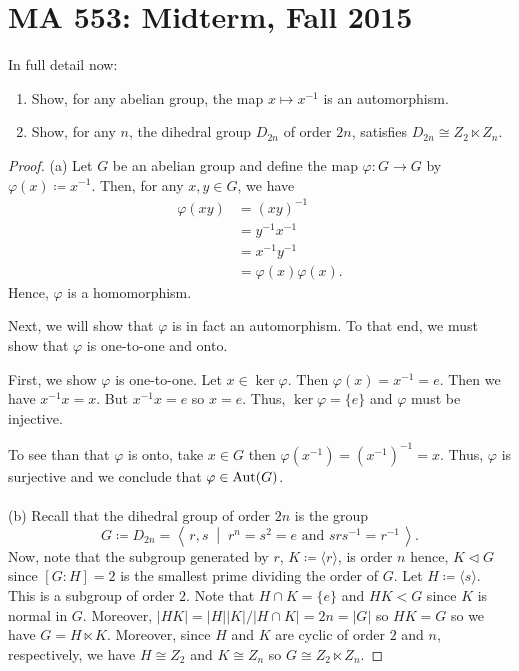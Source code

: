 \chapter{MA 553: Midterm, Fall 2015}
In full detail now:
\begin{problem}
\begin{enumerate}[label=(\alph*)]
\item Show, for any abelian group, the map $x\mapsto x^{-1}$ is an
  automorphism.
\item Show, for any $n$, the dihedral group $D_{2n}$ of order $2n$,
  satisfies $D_{2n}\cong Z_2\ltimes Z_n$.
\end{enumerate}
\end{problem}
\begin{proof}
(a) Let $G$ be an abelian group and define the map $\varphi\colon G\to G$
by $\varphi(x)\coloneqq x^{-1}$. Then, for any $x,y\in G$, we have
\begin{align*}
\varphi(xy)&=(xy)^{-1}\\
           &=y^{-1}x^{-1}\\
           &=x^{-1}y^{-1}\\
           &=\varphi(x)\varphi(x).
\end{align*}
Hence, $\varphi$ is a homomorphism.

Next, we will show that $\varphi$ is in fact an automorphism. To that end,
we must show that $\varphi$ is one-to-one and onto.

First, we show $\varphi$ is one-to-one. Let $x\in\ker\varphi$. Then
$\varphi(x)=x^{-1}=e$. Then we have $x^{-1}x=x$. But $x^{-1}x=e$ so
$x=e$. Thus, $\ker\varphi=\{e\}$ and $\varphi$ must be injective.

To see than that $\varphi$ is onto, take $x\in G$ then
$\varphi(x^{-1})=\left(x^{-1}\right)^{-1}=x$. Thus, $\varphi$ is surjective
and we conclude that $\varphi\in\operatorname{Aut}(G)$.
\\\\
(b) Recall that the dihedral group of order $2n$ is the group
\[
G\coloneqq
D_{2n}=
\left<\,r,s\;\middle|\;\text{$r^n=s^2=e$ and $srs^{-1}=r^{-1}$}\,\right>.
\]
Now, note that the subgroup generated by $r$, $K\coloneqq\langle r\rangle$,
is order $n$ hence, $K\lhd G$ since $[G:H]=2$ is the smallest prime
dividing the order of $G$. Let $H\coloneqq\langle s\rangle$. This is a
subgroup of order $2$. Note that $H\cap K=\{e\}$ and $HK<G$ since $K$ is
normal in $G$. Moreover, $|HK|=|H||K|/|H\cap K|=2n=|G|$ so $HK=G$ so we
have $G=H\ltimes K$. Moreover, since $H$ and $K$ are cyclic of order $2$
and $n$, respectively, we have $H\cong Z_2$ and $K\cong Z_n$ so $G\cong
Z_2\ltimes Z_n$.
\end{proof}

